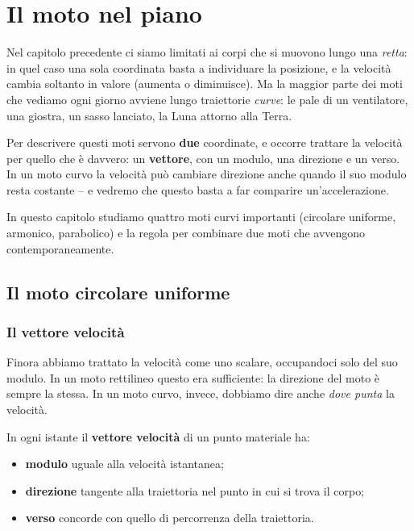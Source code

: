 \chapter{Il moto nel piano}

Nel capitolo precedente ci siamo limitati ai corpi che si muovono lungo una \textit{retta}: in quel caso una sola coordinata basta a individuare la posizione, e la velocità cambia soltanto in valore (aumenta o diminuisce). Ma la maggior parte dei moti che vediamo ogni giorno avviene lungo traiettorie \textit{curve}: le pale di un ventilatore, una giostra, un sasso lanciato, la Luna attorno alla Terra.

Per descrivere questi moti servono \textbf{due} coordinate, e occorre trattare la velocità per quello che è davvero: un \textbf{vettore}, con un modulo, una direzione e un verso. In un moto curvo la velocità può cambiare direzione anche quando il suo modulo resta costante -- e vedremo che questo basta a far comparire un'accelerazione.

In questo capitolo studiamo quattro moti curvi importanti (circolare uniforme, armonico, parabolico) e la regola per combinare due moti che avvengono contemporaneamente.

\section{Il moto circolare uniforme}

\subsection{Il vettore velocità}
Finora abbiamo trattato la velocità come uno scalare, occupandoci solo del suo modulo. In un moto rettilineo questo era sufficiente: la direzione del moto è sempre la stessa. In un moto curvo, invece, dobbiamo dire anche \emph{dove punta} la velocità.

\begin{definizione}
In ogni istante il \textbf{vettore velocità} di un punto materiale ha:
\begin{itemize}
    \item \textbf{modulo} uguale alla velocità istantanea;
    \item \textbf{direzione} tangente alla traiettoria nel punto in cui si trova il corpo;
    \item \textbf{verso} concorde con quello di percorrenza della traiettoria.
\end{itemize}
\end{definizione}

